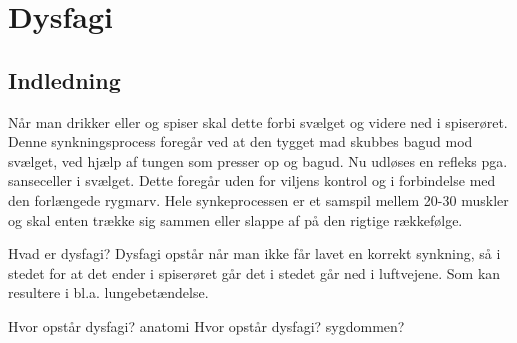 \documentclass[main.tex]{subfiles}
\begin{document}
\chapter*{Dysfagi}
\section*{Indledning}
Når man drikker eller og spiser skal dette forbi svælget og videre ned i spiserøret. Denne synkningsprocess foregår ved at den tygget mad skubbes bagud mod svælget, ved hjælp af tungen som presser op og bagud. Nu udløses en refleks pga. sanseceller i svælget. Dette foregår uden for viljens kontrol og i forbindelse med den forlængede rygmarv. Hele synkeprocessen er et samspil mellem 20-30 muskler og skal enten trække sig sammen eller slappe af på den rigtige rækkefølge. \cite{Sand2008MennesketsFysiologi}

Hvad er dysfagi?
Dysfagi opstår når man ikke får lavet en korrekt synkning, så i stedet for at det ender i spiserøret går det i stedet går ned i luftvejene. Som kan resultere i bl.a. lungebetændelse.\cite{Kjaersgaard2013DifficultiesPerspective}



Hvor opstår dysfagi? anatomi 
Hvor opstår dysfagi? sygdommen?


\end{document}
